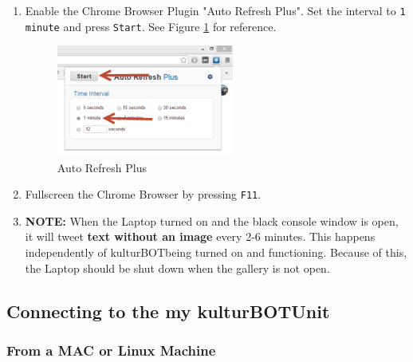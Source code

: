 \documentclass[]{article}
\newcommand{\kb}{kulturBOT}
\newcommand{\kbspace}{\kb \space}
\newcommand{\mykb}{my \kb}
\newcommand{\mykbspace}{\mykb \space}
\begin{document}
\begin{enumerate}
	\item Enable the Chrome Browser Plugin "Auto Refresh Plus". Set the interval to \texttt{1 minute} and press \texttt{Start}. See Figure \ref{autorefresh} for reference.
	
	\begin{figure}[h!]
			\centering
		    \includegraphics[width=0.55\textwidth]{img/autorefresh.png}
		    \caption{Auto Refresh Plus}
		    \label{autorefresh}
		\end{figure}
		
		\item Fullscreen the Chrome Browser by pressing \texttt{F11}.
		
		\item \textbf{NOTE:} When the Laptop turned on and the black console window is open, it will tweet \textbf{text without an image} every 2-6 minutes. This happens independently of \kbspace being turned on and functioning. Because of this, the Laptop should be shut down when the gallery is not open.
\end{enumerate}

\subsection{Connecting to the \mykbspace Unit}

\subsubsection{From a MAC or Linux Machine}
\end{document}
